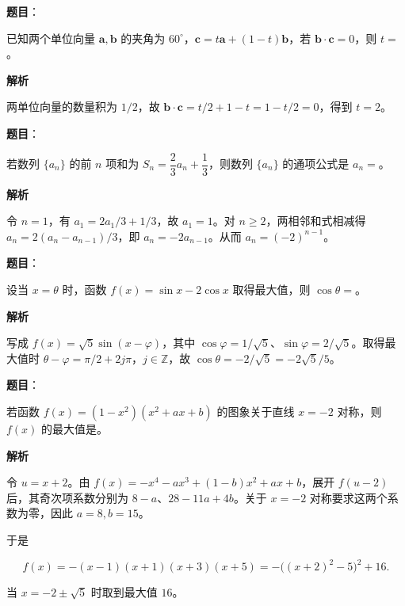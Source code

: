 \begin{answer}

\textbf{题目}：

已知两个单位向量 $\boldsymbol a,\boldsymbol b$ 的夹角为 $60^\circ$，$\boldsymbol c=t\boldsymbol a+(1-t)\boldsymbol b$，若 $\boldsymbol b\cdot\boldsymbol c=0$，则 $t=$\gkblank{}。

\textbf{解析}

两单位向量的数量积为 $1/2$，故 $\boldsymbol b\cdot\boldsymbol c=t/2+1-t=1-t/2=0$，得到 $t=2$。


\end{answer}
\begin{answer}

\textbf{题目}：

若数列 $\{a_n\}$ 的前 $n$ 项和为 $S_n=\dfrac23a_n+\dfrac13$，则数列 $\{a_n\}$ 的通项公式是 $a_n=$\gkblank{}。

\textbf{解析}

令 $n=1$，有 $a_1=2a_1/3+1/3$，故 $a_1=1$。对 $n\geqslant2$，两相邻和式相减得 $a_n=2(a_n-a_{n-1})/3$，即 $a_n=-2a_{n-1}$。从而 $a_n=(-2)^{n-1}$。


\end{answer}
\begin{answer}

\textbf{题目}：

设当 $x=\theta$ 时，函数 $f(x)=\sin x-2\cos x$ 取得最大值，则 $\cos\theta=$\gkblank{}。

\textbf{解析}

写成 $f(x)=\sqrt5\sin(x-\varphi)$，其中 $\cos\varphi=1/\sqrt5$、$\sin\varphi=2/\sqrt5$。取得最大值时 $\theta-\varphi=\pi/2+2j\pi$，$j\in\mathbb Z$，故 $\cos\theta=-2/\sqrt5=-2\sqrt5/5$。


\end{answer}
\begin{answer}

\textbf{题目}：

若函数 $f(x)=(1-x^2)(x^2+ax+b)$ 的图象关于直线 $x=-2$ 对称，则 $f(x)$ 的最大值是\gkblank{}。

\textbf{解析}

令 $u=x+2$。由 $f(x)=-x^4-ax^3+(1-b)x^2+ax+b$，展开 $f(u-2)$ 后，其奇次项系数分别为 $8-a$、$28-11a+4b$。关于 $x=-2$ 对称要求这两个系数为零，因此 $a=8,b=15$。

于是

\nopagebreak[4]
\[
f(x)=-(x-1)(x+1)(x+3)(x+5)
=-\bigl((x+2)^2-5\bigr)^2+16.
\]

当 $x=-2\pm\sqrt5$ 时取到最大值 $16$。


\end{answer}

